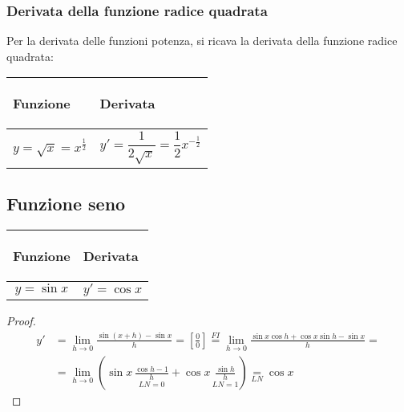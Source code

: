 \subsubsection{Derivata della funzione radice quadrata}
Per la derivata delle funzioni potenza, si ricava la derivata della funzione radice quadrata:
\begin{center}
    \begin{tabular}{m{}|m{}}
        \begin{center}
            \textbf{Funzione}
        \end{center}
        & 
        \begin{center}
            \textbf{Derivata}
        \end{center}\\
        \hline
            \[y=\sqrt{x}=x^{\frac{1}{2}}\] &
            \[y'=\frac{1}{2\sqrt{x}} = \frac{1}{2}x ^{-\frac{1}{2}}\]
    \end{tabular}
\end{center}

\subsection{Funzione seno}
\begin{center}
    \begin{tabular}{m{}|m{}}
        \begin{center}
            \textbf{Funzione}
        \end{center}
        & 
        \begin{center}
            \textbf{Derivata}
        \end{center}\\
        \hline
            \[y=\sin x\]&
            \[y'=\cos x\]
    \end{tabular}
\end{center}
\begin{proof}
    \[\begin{aligned}y'&=\lim_{h\to 0}\frac{\sin(x+h)-\sin x}{h}=\left[ \frac{0}{0} \right]\overset{FI}{=}\lim_{h\to 0}\frac{\sin x \cos h + \cos x \sin h - \sin x}{h}=\\&=\lim_{h\to 0}\left(\sin x\,\underset{LN=0}{\boxed{\frac{\cos h-1}{h}}}+\cos x\,\underset{LN=1}{\boxed{\frac{\sin h}{h}}}\right)\underset{LN}=\cos x\end{aligned}\]
\end{proof}


